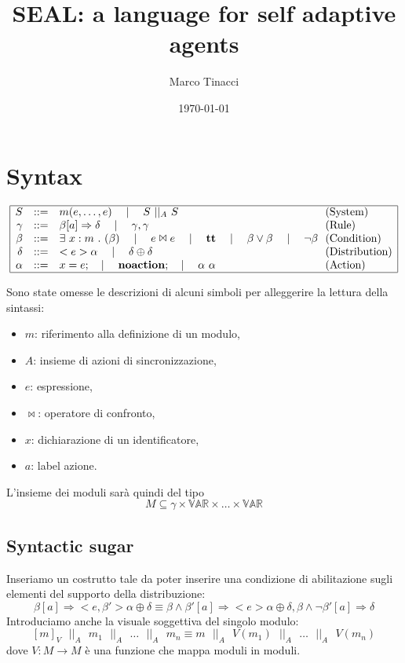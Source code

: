 \documentclass{article}
\title{SEAL: a language for self adaptive agents}
\author{Marco Tinacci}
\date{\today}
\newcommand{\Sep}{\quad\mid\quad}
\newcommand{\Space}{\mbox{ }}
\newcommand{\Par}{\Space||_A\Space}
\begin{document}
\maketitle
\tableofcontents
\section{Syntax}

$$
\begin{array}{|rcl@{\ \ }l|}
\hline
S &::=& m(e, \dots, e) \Sep S \Par S & \mbox{(System)} \\
\gamma &::=& \beta [a]\Rightarrow \delta \Sep \gamma,\gamma & \mbox{(Rule)} \\
\beta &::=& \exists \Space x:m \Space . \Space (\beta) \Sep e \Join e \Sep \mathbf{tt} \Sep \beta \vee \beta \Sep \neg\beta & \mbox{(Condition)} \\
\delta &::=& <e> \alpha \Sep \delta \oplus \delta & \mbox{(Distribution)} \\
\alpha &::=& x = e; \Sep \mathbf{no action}; \Sep \alpha \Space \alpha & \mbox{(Action)} \\
\hline
\end{array}
$$

Sono state omesse le descrizioni di alcuni simboli per alleggerire la lettura della sintassi:
\begin{itemize}
	\item $m$: riferimento alla definizione di un modulo,
	\item $A$: insieme di azioni di sincronizzazione,
	\item $e$: espressione,
	\item $\Join$: operatore di confronto,
	\item $x$: dichiarazione di un identificatore,
	\item $a$: label azione.
\end{itemize}

L'insieme dei moduli sarà quindi del tipo
$$ M \subseteq \gamma \times \mathbb{VAR} \times \dots \times \mathbb{VAR} $$

\subsection{Syntactic sugar}
Inseriamo un costrutto tale da poter inserire una condizione di abilitazione sugli elementi del supporto della distribuzione:
$$
\beta [a]\Rightarrow <e,\beta'> \alpha \oplus \delta
\equiv 
\beta \wedge \beta' [a]\Rightarrow <e> \alpha \oplus \delta,
\beta \wedge \neg\beta' [a]\Rightarrow \delta
$$
Introduciamo anche la visuale soggettiva del singolo modulo:
$$
[m]_V \Par m_1 \Par \dots \Par m_n \equiv m \Par V(m_1) \Par \dots \Par V(m_n)
$$
dove $V:M \rightarrow M$ è una funzione che mappa moduli in moduli.
\end{document}
